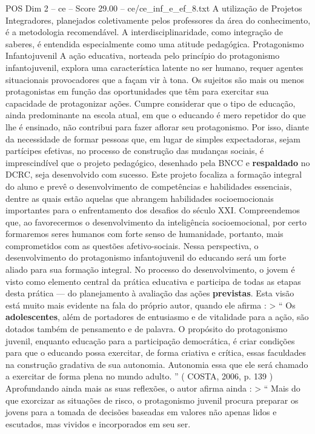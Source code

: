 \begin{textsample}{POS Dim 2 – ce – Score 29.00 – ce/ce\_inf\_e\_ef\_8.txt}
A utilização de Projetos Integradores, planejados coletivamente pelos professores da área do conhecimento, é a metodologia recomendável.
A interdisciplinaridade, como integração de saberes, é entendida especialmente como uma atitude pedagógica.
Protagonismo Infantojuvenil A ação educativa, norteada pelo princípio do protagonismo infantojuvenil, explora uma característica latente no ser humano, requer agentes situacionais provocadores que a façam vir à tona.
Os sujeitos são mais ou menos protagonistas em função das oportunidades que têm para exercitar sua capacidade de protagonizar ações.
Cumpre considerar que o tipo de educação, ainda predominante na escola atual, em que o educando é mero repetidor do que lhe é ensinado, não contribui para fazer aflorar seu protagonismo.
Por isso, diante da necessidade de formar pessoas que, em lugar de simples expectadoras, sejam partícipes efetivas, no processo de construção das mudanças sociais, é imprescindível que o projeto pedagógico, desenhado pela BNCC e \textbf{respaldado} no DCRC, seja desenvolvido com sucesso.
Este projeto focaliza a formação integral do aluno e prevê o desenvolvimento de competências e habilidades essenciais, dentre as quais estão aquelas que abrangem habilidades socioemocionais importantes para o enfrentamento dos desafios do século XXI.
Compreendemos que, ao favorecermos o desenvolvimento da inteligência socioemocional, por certo formaremos seres humanos com forte senso de humanidade, portanto, mais comprometidos com as questões afetivo-sociais.
Nessa perspectiva, o desenvolvimento do protagonismo infantojuvenil do educando será um forte aliado para sua formação integral.
No processo do desenvolvimento, o jovem é visto como elemento central da prática educativa e participa de todas as etapas desta prática — do planejamento à avaliação das ações \textbf{previstas}.
Esta visão está muito mais evidente na fala do próprio autor, quando ele afirma : > “ Os \textbf{adolescentes}, além de portadores de entusiasmo e de vitalidade para a ação, são dotados também de pensamento e de palavra.
O propósito do protagonismo juvenil, enquanto educação para a participação democrática, é criar condições para que o educando possa exercitar, de forma criativa e crítica, essas faculdades na construção gradativa de sua autonomia.
Autonomia essa que ele será chamado a exercitar de forma plena no mundo adulto. ” ( COSTA, 2006, p. 139 ) Aprofundando ainda mais as suas reflexões, o autor afirma ainda : > “ Mais do que exorcizar as situações de risco, o protagonismo juvenil procura preparar os jovens para a tomada de decisões baseadas em valores não apenas lidos e escutados, mas vividos e incorporados em seu ser.

\end{textsample}
